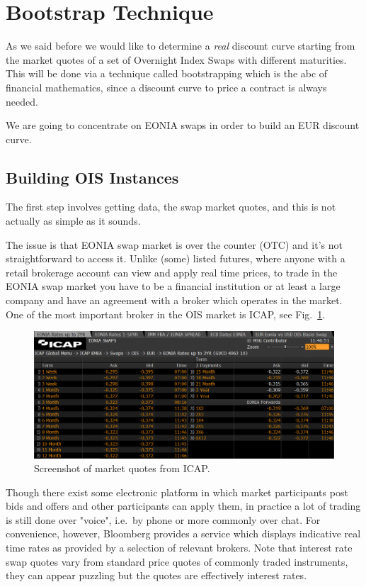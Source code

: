 \section{Bootstrap Technique}
\label{bootstrapping-technique}

As we said before we would like to determine a \emph{real} discount
curve starting from the market quotes of a set of Overnight Index Swaps with different maturities. This will be done via a technique called bootstrapping which is the abc of financial mathematics, since a discount curve to price a contract is always needed.

We are going to concentrate on EONIA swaps in order to build an EUR discount curve.

\subsection{Building OIS Instances}
\label{building-ois-instances}

The first step involves getting data, the swap market quotes, and this is not actually as simple as it sounds.

The issue is that EONIA swap market is over the counter (OTC) and it's not straightforward to access it. Unlike (some) listed futures, where anyone with a retail brokerage account can view and apply real time prices, to trade in the EONIA swap market you have to be a financial institution or at least a large company and have an agreement with a broker which operates in the market. One of the most important broker in the OIS market is ICAP, see Fig.~\ref{fig:icap}.

\begin{figure}[bth]
  \centering
\includegraphics[width=1.\linewidth]{figures/icap_3.png}
\caption{Screenshot of market quotes from ICAP.}
\label{fig:icap}
\end{figure}

Though there exist some electronic platform in which market participants post bids and offers and other participants can apply them, in practice a lot of trading is still done over "voice", i.e.~by phone or more commonly over chat. For convenience, however, Bloomberg provides a service which displays indicative real time rates as provided by a selection of relevant brokers. Note that interest rate swap quotes vary from standard price quotes of commonly traded instruments, they can appear puzzling but the quotes are effectively interest rates.

